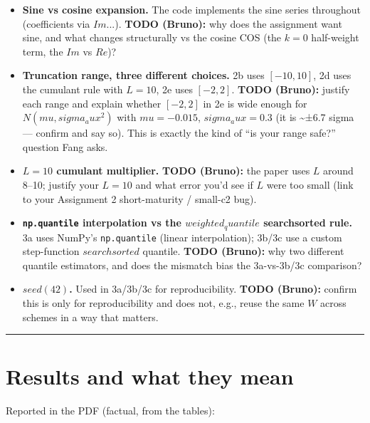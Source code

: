 \documentclass[
  11pt,
]{article}
\providecommand{\tightlist}{%
  \setlength{\itemsep}{0pt}\setlength{\parskip}{0pt}}
\begin{document}
\begin{itemize}
\tightlist
\item
  \textbf{Sine vs cosine expansion.} The code implements the sine series
  throughout (coefficients via \(Im{...}\)). \textbf{TODO (Bruno):} why
  does the assignment want sine, and what changes structurally vs the
  cosine COS (the \(k=0\) half-weight term, the \(Im\) vs \(Re\))?
\item
  \textbf{Truncation range, three different choices.} 2b uses
  \([-10,10]\), 2d uses the cumulant rule with \(L=10\), 2e uses
  \([-2,2]\). \textbf{TODO (Bruno):} justify each range and explain
  whether \([-2,2]\) in 2e is wide enough for \(N(mu, sigma_aux^2)\)
  with \(mu = -0.015\), \(sigma_aux = 0.3\) (it is \textasciitilde±6.7
  sigma --- confirm and say so). This is exactly the kind of ``is your
  range safe?'' question Fang asks.
\item
  \textbf{\(L = 10\) cumulant multiplier.} \textbf{TODO (Bruno):} the
  paper uses \(L\) around 8--10; justify your \(L=10\) and what error
  you'd see if \(L\) were too small (link to your Assignment 2
  short-maturity / small-c2 bug).
\item
  \textbf{\texttt{np.quantile} interpolation vs the
  \(weighted_quantile\) searchsorted rule.} 3a uses NumPy's
  \texttt{np.quantile} (linear interpolation); 3b/3c use a custom
  step-function \(searchsorted\) quantile. \textbf{TODO (Bruno):} why
  two different quantile estimators, and does the mismatch bias the
  3a-vs-3b/3c comparison?
\item
  \textbf{\(seed(42)\).} Used in 3a/3b/3c for reproducibility.
  \textbf{TODO (Bruno):} confirm this is only for reproducibility and
  does not, e.g., reuse the same \(W\) across schemes in a way that
  matters.
\end{itemize}

\begin{center}\rule{0.5\linewidth}{0.5pt}\end{center}

\hypertarget{results-and-what-they-mean}{%
\section{Results and what they mean}\label{results-and-what-they-mean}}

Reported in the PDF (factual, from the tables):
\end{document}
